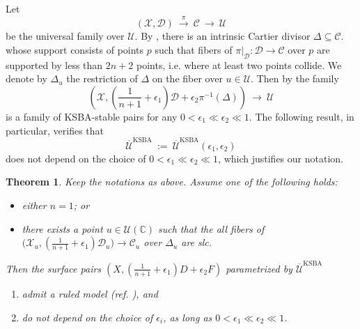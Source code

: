 \documentclass[a4paper,12pt]{amsart}
\newcommand{\ove}[1]{\overline{#1}}
\DeclareMathOperator{\KSBA}{\mathrm{KSBA}}
\newcommand{\bC}{{\mathbb C}}
\newcommand{\sD}{{\mathscr{D}}}
\newcommand{\sX}{{\mathscr{X}}}
\newcommand{\sC}{{\mathscr{C}}}
\newcommand{\cU}{{\mathcal{U}}}
\newtheorem{theorem}{Theorem}[section]
\theoremstyle{definition}
\theoremstyle{remark}
\begin{document}
Let $$\textstyle (\sX,\sD)\ \stackrel{\pi}{\longrightarrow}\  \sC \ \longrightarrow \ \cU$$ be the universal family over $\cU$. By , there is an intrinsic Cartier divisor $\Delta\subseteq \sC$. whose support consists of points $p$ such that fibers of $\pi|_{\sD}:\sD\rightarrow \sC$ over $p$ are supported by less than $2n+2$ points, i.e. where at least two points collide. We denote by $\Delta_u$ the restriction of $\Delta$ on the fiber over $u\in \cU$. Then by  the family
 \[\textstyle
 \left(\sX,(\frac{1}{n+1}+\epsilon_1)\sD + \epsilon_2\pi^{-1}(\Delta)\right)\ \longrightarrow \ \cU
 \]
 is a family of KSBA-stable pairs for any $0<\epsilon_1\ll \epsilon_2\ll 1$. The following result, in particular, verifies that $$\ove{\cU}^{\KSBA}\ := \ \ove{\cU}^{\KSBA}(\epsilon_1,\epsilon_2)$$ does not depend on the choice of $0<\epsilon_1\ll \epsilon_2\ll 1$, which justifies our notation.
 \begin{theorem}\label{thm_section_4_in_ksba_limit_we_have_ruled_model}
     Keep the notations as above. Assume one of the following holds: 
     \begin{itemize}
         \item either $n=1$; or
         \item there exists a point $u\in \cU(\bC)$ such that the all fibers of $\big(\sX_u,(\frac{1}{n+1}+\epsilon_1)\sD_u\big)\to \sC_u$ over $\Delta_u$ are slc.
     \end{itemize} Then the surface pairs $(X,(\frac{1}{n+1}+\epsilon_1)D+\epsilon_2F)$ parametrized by $\ove{\cU}^{\KSBA}$ 
\begin{enumerate}
\item admit a ruled model (ref. ), and
\item do not depend on the choice of $\epsilon_i$, as long as $0<\epsilon_1\ll \epsilon_2\ll 1$.
\end{enumerate} 
 \end{theorem}
\end{document}
